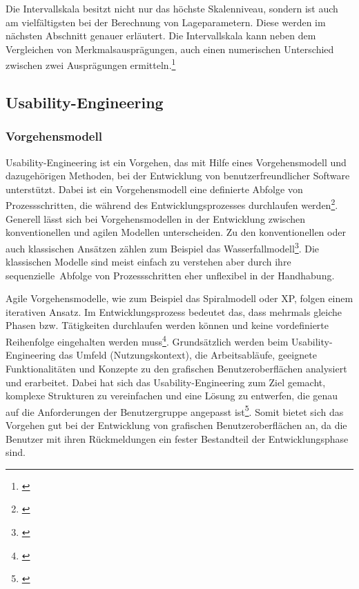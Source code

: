 Die Intervallskala besitzt nicht nur das höchste Skalenniveau, sondern ist auch am vielfältigsten bei der Berechnung von Lageparametern. Diese werden im nächsten Abschnitt genauer erläutert. Die Intervallskala kann neben dem Vergleichen von Merkmalsausprägungen, auch einen numerischen Unterschied zwischen zwei Ausprägungen ermitteln.\footnote{\cite[vgl.][15\psqq]{Statistik2016}}


\subsection{Usability-Engineering}
\label{sec:usabilityEngineering}
\subsubsection{Vorgehensmodell}
\label{sec:vorgehensmodellUsabilityEngineering}
Usability-Engineering ist ein Vorgehen, das mit Hilfe eines Vorgehensmodell und dazugehörigen Methoden, bei der Entwicklung von benutzerfreundlicher Software unterstützt. Dabei ist ein Vorgehensmodell eine definierte Abfolge von Prozessschritten, die während des Entwicklungsprozesses durchlaufen werden\footnote{\cite[vgl.][7]{Richter2013}}. Generell lässt sich bei Vorgehensmodellen in der Entwicklung zwischen konventionellen und agilen Modellen unterscheiden. Zu den konventionellen oder auch klassischen Ansätzen zählen zum Beispiel das Wasserfallmodell\footnote{\cite[vgl.][27\psqq]{Brandt2008}}. Die klassischen Modelle sind meist einfach zu verstehen aber durch ihre sequenzielle\ Abfolge von Prozessschritten eher unflexibel in der Handhabung.

Agile Vorgehensmodelle, wie zum Beispiel das Spiralmodell oder \gls{XP}, folgen einem iterativen Ansatz. Im Entwicklungsprozess bedeutet das, dass mehrmals gleiche Phasen bzw. Tätigkeiten durchlaufen werden können und keine vordefinierte Reihenfolge eingehalten werden muss\footnote{\cite[vgl.][29\psqq]{Brandt2008}}. Grundsätzlich werden beim Usability-Engineering das Umfeld (Nutzungskontext), die Arbeitsabläufe, geeignete Funktionalitäten und Konzepte zu den grafischen Benutzeroberflächen analysiert und erarbeitet. Dabei hat sich das Usability-Engineering zum Ziel gemacht, komplexe Strukturen zu vereinfachen und eine Lösung zu entwerfen, die genau auf die Anforderungen der Benutzergruppe angepasst ist\footnote{\cite[vgl.][7]{Richter2013}}. Somit bietet sich das Vorgehen gut bei der Entwicklung von grafischen Benutzeroberflächen an, da die Benutzer mit ihren Rückmeldungen ein fester Bestandteil der Entwicklungsphase sind.

